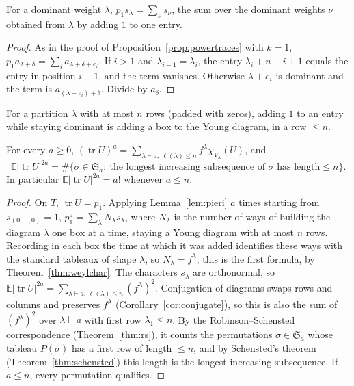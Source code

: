 \begin{lemma}\label{lem:pieri}
For a dominant weight $\lambda$, $p_1s_\lambda=\sum_\nu s_\nu$, the sum over the dominant weights $\nu$ obtained from $\lambda$ by adding $1$ to one entry.
\end{lemma}

\begin{proof}
As in the proof of Proposition~\ref{prop:powertraces} with $k=1$, $p_1a_{\lambda+\delta}=\sum_ia_{\lambda+\delta+e_i}$. If $i>1$ and $\lambda_{i-1}=\lambda_i$, the entry $\lambda_i+n-i+1$ equals the entry in position $i-1$, and the term vanishes. Otherwise
$\lambda+e_i$ is dominant and the term is $a_{(\lambda+e_i)+\delta}$. Divide by $a_\delta$.
\end{proof}

For a partition $\lambda$ with at most $n$ rows (padded with zeros), adding $1$ to an entry while staying dominant is adding a box to the Young diagram, in a row $\le n$.

\begin{theorem}\label{thm:traces}
For every $a\ge0$, $(\operatorname{tr}U)^a=\sum_{\lambda\vdash a,\ \ell(\lambda)\le n}f^\lambda\chi_{V_\lambda}(U)$, and
\[
\mathbb E\bigl|\operatorname{tr}U\bigr|^{2a}=\#\bigl\{\sigma\in\mathfrak S_a:\ \text{the longest increasing subsequence of $\sigma$ has length}\le n\bigr\}.
\]
In particular $\mathbb E|\operatorname{tr}U|^{2a}=a!$ whenever $a\le n$.
\end{theorem}

\begin{proof}
On $T$, $\operatorname{tr}U=p_1$. Applying Lemma~\ref{lem:pieri} $a$ times starting from $s_{(0,\dots,0)}=1$, $p_1^a=\sum_\lambda N_\lambda s_\lambda$, where $N_\lambda$ is the number of ways of building the diagram $\lambda$ one box at a time, staying a Young diagram with
at most $n$ rows. Recording in each box the time at which it was added identifies these ways with the standard tableaux of shape $\lambda$, so $N_\lambda=f^\lambda$; this is the first formula, by Theorem~\ref{thm:weylchar}. The characters $s_\lambda$ are orthonormal,
so $\mathbb E|\operatorname{tr}U|^{2a}=\sum_{\lambda\vdash a,\,\ell(\lambda)\le n}(f^\lambda)^2$. Conjugation of diagrams swaps rows and columns and preserves $f^\lambda$ (Corollary~\ref{cor:conjugate}), so this is also the sum of $(f^\lambda)^2$ over $\lambda\vdash a$ with first
row $\lambda_1\le n$. By the Robinson--Schensted correspondence (Theorem~\ref{thm:rs}), it counts the permutations $\sigma\in\mathfrak S_a$ whose tableau $P(\sigma)$ has a first row of length $\le n$, and by Schensted's theorem (Theorem~\ref{thm:schensted}) this length is the longest
increasing subsequence. If $a\le n$, every permutation qualifies.
\end{proof}

